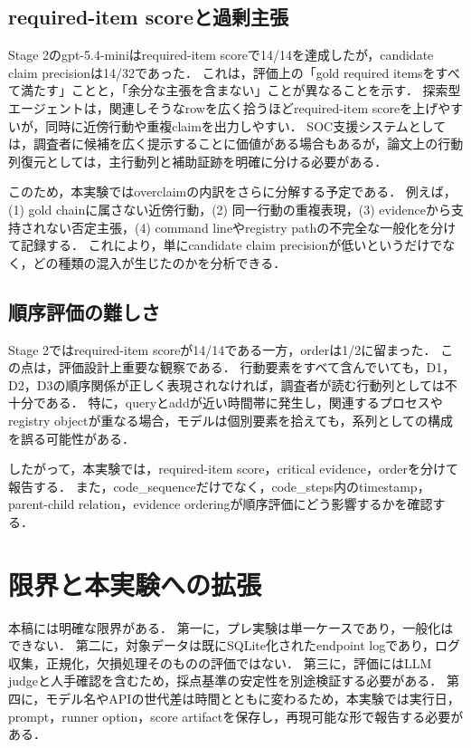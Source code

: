 \documentclass[a4paper,twocolumn,10pt]{ltjsarticle}
\newcommand{\code}[1]{{\small\ttfamily\addfontfeatures{Scale=0.95}#1}}
\begin{document}
\subsection{required-item scoreと過剰主張}

Stage 2のgpt-5.4-miniはrequired-item scoreで14/14を達成したが，candidate claim precisionは14/32であった．
これは，評価上の「gold required itemsをすべて満たす」ことと，「余分な主張を含まない」ことが異なることを示す．
探索型エージェントは，関連しそうなrowを広く拾うほどrequired-item scoreを上げやすいが，同時に近傍行動や重複claimを出力しやすい．
SOC支援システムとしては，調査者に候補を広く提示することに価値がある場合もあるが，論文上の行動列復元としては，主行動列と補助証跡を明確に分ける必要がある．

このため，本実験ではoverclaimの内訳をさらに分解する予定である．
例えば，(1) gold chainに属さない近傍行動，(2) 同一行動の重複表現，(3) evidenceから支持されない否定主張，(4) command lineやregistry pathの不完全な一般化を分けて記録する．
これにより，単にcandidate claim precisionが低いというだけでなく，どの種類の混入が生じたのかを分析できる．

\subsection{順序評価の難しさ}

Stage 2ではrequired-item scoreが14/14である一方，orderは1/2に留まった．
この点は，評価設計上重要な観察である．
行動要素をすべて含んでいても，D1，D2，D3の順序関係が正しく表現されなければ，調査者が読む行動列としては不十分である．
特に，queryとaddが近い時間帯に発生し，関連するプロセスやregistry objectが重なる場合，モデルは個別要素を拾えても，系列としての構成を誤る可能性がある．

したがって，本実験では，required-item score，critical evidence，orderを分けて報告する．
また，\code{code\_sequence}だけでなく，\code{code\_steps}内のtimestamp，parent-child relation，evidence orderingが順序評価にどう影響するかを確認する．

\section{限界と本実験への拡張}

本稿には明確な限界がある．
第一に，プレ実験は単一ケースであり，一般化はできない．
第二に，対象データは既にSQLite化されたendpoint logであり，ログ収集，正規化，欠損処理そのものの評価ではない．
第三に，評価にはLLM judgeと人手確認を含むため，採点基準の安定性を別途検証する必要がある．
第四に，モデル名やAPIの世代差は時間とともに変わるため，本実験では実行日，prompt，runner option，score artifactを保存し，再現可能な形で報告する必要がある．
\end{document}
